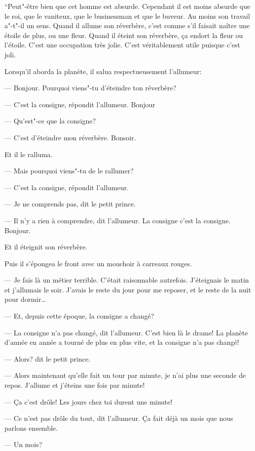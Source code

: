 \begin{Parallel}[p]{}{}
{``Peut"-être bien que cet homme est absurde.
Cependant il est moins absurde que le roi, que le
vaniteux, que le businessman et que le buveur. Au
moins son travail a"-t"-il un sens. Quand il allume son
réverbère, c'est comme s'il faisait naître une étoile
de plus, ou une fleur. Quand il éteint son réverbère,
ça endort la fleur ou l'étoile. C'est une occupation très jolie. C'est véritablement utile puisque c'est
joli.

Lorsqu'il aborda la planète, il salua respectueusement l'allumeur:

--- Bonjour. Pourquoi viens"-tu d'éteindre ton réverbère?

--- C'est la consigne, répondit l'allumeur. Bonjour

--- Qu'est"-ce que la consigne?

--- C'est d'éteindre mon réverbère. Bonsoir.

Et il le ralluma.

--- Mais pourquoi viens"-tu de le rallumer?

--- C'est la consigne, répondit l'allumeur.

--- Je ne comprends pas, dit le petit prince.

--- Il n'y a rien à comprendre, dit l'allumeur. La
consigne c'est la consigne. Bonjour.

Et il éteignit son réverbère.

Puis il s'épongea le front avec un mouchoir à carreaux rouges.

--- Je fais là un métier terrible. C'était raisonnable
autrefois. J'éteignais le matin et j'allumais le soir.
J'avais le reste du jour pour me reposer, et le reste
de la nuit pour dormir\ldots{}

--- Et, depuis cette époque, la consigne a changé?

--- La consigne n'a pas changé, dit l'allumeur.
C'est bien là le drame! La planète d'année en année a tourné de plus en plus vite, et la consigne n'a
pas changé!

--- Alors? dit le petit prince.

--- Alors maintenant qu'elle fait un tour par
minute, je n'ai plus une seconde de repos. J'allume
et j'éteins une fois par minute!

--- Ça c'est drôle! Les jours chez toi durent une
minute!

--- Ce n'est pas drôle du tout, dit l'allumeur. Ça
fait déjà un mois que nous parlons ensemble.

--- Un mois?

}
\end{Parallel}
